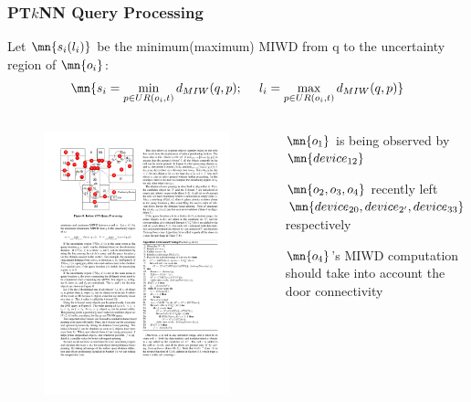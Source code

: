 \begin{frame}
\frametitle{PT$k$NN Query Processing}

\footnotesize{
Let $\mn{s_i (l_i)}$ be the minimum(maximum) MIWD from q to the uncertainty region of $\mn{o_i}$:
\pause
\begin{equation}
  \mn{s_i = \min_{p \in UR(o_i,t)} d_{MIW}(q, p);~~~~l_i = \max_{p \in UR(o_i,t)} d_{MIW}(q, p)}
\end{equation}
}

\begin{columns}[c]

\begin{figure}[tb]
  \includegraphics[width=\columnwidth]{figures/2-3/2-3-8.pdf}
\end{figure}

\begin{fitemize}
  \item $\mn{o_1}$ is being observed by $\mn{device_{12}}$
  \item $\mn{o_2, o_3, o_4}$ recently left $\mn{device_{20}, device_{2'}, device_{33}}$ respectively
  \item $\mn{o_4}$'s MIWD computation should take into account the door connectivity
\end{fitemize}

\end{columns}

\end{frame}

